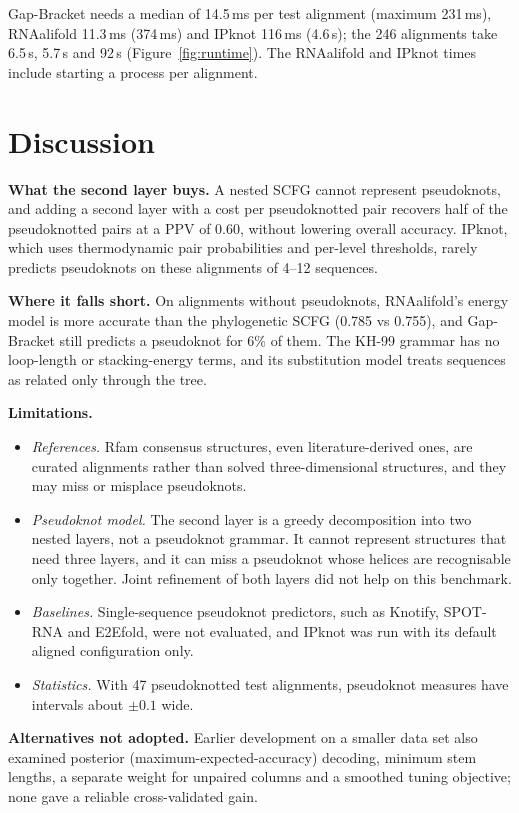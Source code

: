 \documentclass[10pt, twocolumn]{article}
\newcommand{\GB}{Gap-Bracket}
\begin{document}
\GB{} needs a median of 14.5\,ms per test alignment (maximum 231\,ms), RNAalifold 11.3\,ms (374\,ms) and IPknot 116\,ms (4.6\,s); the 246 alignments take 6.5\,s, 5.7\,s and 92\,s (Figure~\ref{fig:runtime}). The RNAalifold and IPknot times include starting a process per alignment.

\section{Discussion}
\textbf{What the second layer buys.} A nested SCFG cannot represent pseudoknots, and adding a second layer with a cost per pseudoknotted pair recovers half of the pseudoknotted pairs at a PPV of 0.60, without lowering overall accuracy. IPknot, which uses thermodynamic pair probabilities and per-level thresholds, rarely predicts pseudoknots on these alignments of 4--12 sequences.

\textbf{Where it falls short.} On alignments without pseudoknots, RNAalifold's energy model is more accurate than the phylogenetic SCFG (0.785 vs 0.755), and \GB{} still predicts a pseudoknot for 6\% of them. The KH-99 grammar has no loop-length or stacking-energy terms, and its substitution model treats sequences as related only through the tree.

\textbf{Limitations.}
\begin{itemize}
    \item \emph{References.} Rfam consensus structures, even literature-derived ones, are curated alignments rather than solved three-dimensional structures, and they may miss or misplace pseudoknots.
    \item \emph{Pseudoknot model.} The second layer is a greedy decomposition into two nested layers, not a pseudoknot grammar. It cannot represent structures that need three layers, and it can miss a pseudoknot whose helices are recognisable only together. Joint refinement of both layers did not help on this benchmark.
    \item \emph{Baselines.} Single-sequence pseudoknot predictors, such as Knotify, SPOT-RNA and E2Efold, were not evaluated, and IPknot was run with its default aligned configuration only.
    \item \emph{Statistics.} With 47 pseudoknotted test alignments, pseudoknot measures have intervals about $\pm 0.1$ wide.
\end{itemize}

\textbf{Alternatives not adopted.} Earlier development on a smaller data set also examined posterior (maximum-expected-accuracy) decoding, minimum stem lengths, a separate weight for unpaired columns and a smoothed tuning objective; none gave a reliable cross-validated gain.
\end{document}
